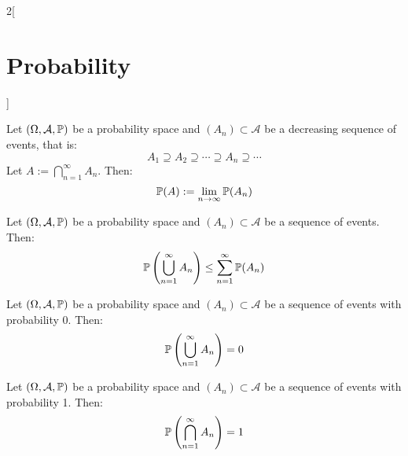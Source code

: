 \documentclass[../../../main_math.tex]{subfiles}
\begin{document}
\begin{multicols}{2}[\section{Probability}]
  \begin{corollary}
    Let $(\Omega,\mathcal{A},\mathbb{P})$ be a probability space and $(A_n)\subset\mathcal{A}$ be a decreasing sequence of events, that is: $$A_1\supseteq A_2\supseteq\cdots\supseteq A_n\supseteq\cdots$$ Let $A:=\bigcap_{n=1}^\infty A_n$. Then: $$\mathbb{P}(A):=\lim_{n\to\infty}\mathbb{P}(A_n)$$
  \end{corollary}
  \begin{proposition}
    Let $(\Omega,\mathcal{A},\mathbb{P})$ be a probability space and $(A_n)\subset\mathcal{A}$ be a sequence of events. Then: $$\mathbb{P}\left(\bigcup_{n=1}^\infty A_n\right)\leq\sum_{n=1}^\infty \mathbb{P}(A_n)$$
  \end{proposition}
  \begin{corollary}
    Let $(\Omega,\mathcal{A},\mathbb{P})$ be a probability space and $(A_n)\subset\mathcal{A}$ be a sequence of events with probability 0. Then: $$\mathbb{P}\left(\bigcup_{n=1}^\infty A_n\right)=0$$
  \end{corollary}
  \begin{corollary}
    Let $(\Omega,\mathcal{A},\mathbb{P})$ be a probability space and $(A_n)\subset\mathcal{A}$ be a sequence of events with probability 1. Then: $$\mathbb{P}\left(\bigcap_{n=1}^\infty A_n\right)=1$$
  \end{corollary}

\end{multicols}
\end{document}
